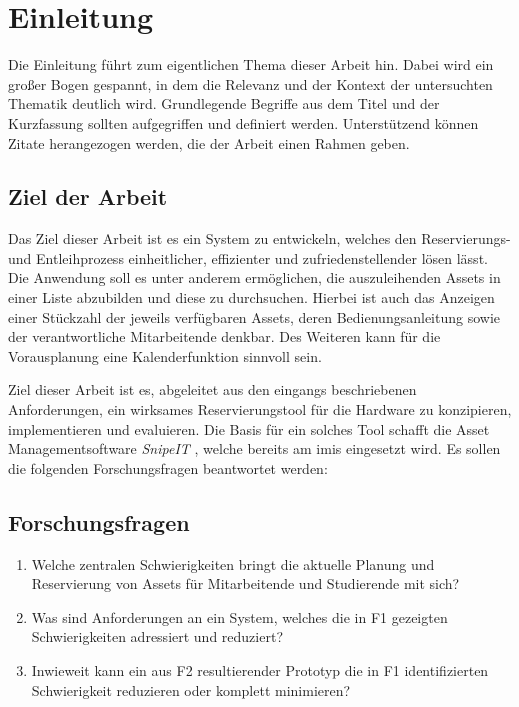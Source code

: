 
\chapter{Einleitung}

Die Einleitung führt zum eigentlichen Thema dieser Arbeit hin. Dabei wird ein großer Bogen gespannt,
in dem die Relevanz und der Kontext der untersuchten Thematik deutlich wird. Grundlegende Begriffe
aus dem Titel und der Kurzfassung sollten aufgegriffen und definiert werden. Unterstützend können
Zitate herangezogen werden, die der Arbeit einen Rahmen geben.



\section{Ziel der Arbeit}
Das Ziel dieser Arbeit ist es ein System zu entwickeln, welches den Reservierungs- und Entleihprozess einheitlicher, effizienter und zufriedenstellender lösen lässt. Die Anwendung soll es unter anderem ermöglichen, die auszuleihenden Assets in einer Liste abzubilden und diese zu durchsuchen.
Hierbei ist auch das Anzeigen einer Stückzahl der jeweils verfügbaren Assets, deren Bedienungsanleitung sowie der verantwortliche Mitarbeitende denkbar. Des Weiteren kann für die Vorausplanung
eine Kalenderfunktion sinnvoll sein.

Ziel dieser Arbeit ist es, abgeleitet aus den eingangs beschriebenen Anforderungen, ein wirksames
Reservierungstool für die Hardware zu konzipieren, implementieren und evaluieren. Die Basis für
ein solches Tool schafft die Asset Managementsoftware \textit{SnipeIT} \cite{noauthor_home_nodate}, welche bereits am \ac{imis} eingesetzt wird.
Es sollen die folgenden Forschungsfragen beantwortet werden:



\section{Forschungsfragen}
\begin{enumerate}
  \item[\sffamily\color{maincolor} {F1}] {Welche zentralen Schwierigkeiten bringt die aktuelle Planung und Reservierung von Assets für Mitarbeitende und Studierende mit sich?}
  \item[\sffamily\color{maincolor} {F2}] {Was sind Anforderungen an ein System, welches die in F1 gezeigten Schwierigkeiten adressiert und reduziert?}
  \item[\sffamily\color{maincolor} {F3}] {Inwieweit kann ein aus F2 resultierender Prototyp die in F1 identifizierten Schwierigkeit reduzieren oder komplett minimieren?}
\end{enumerate}


